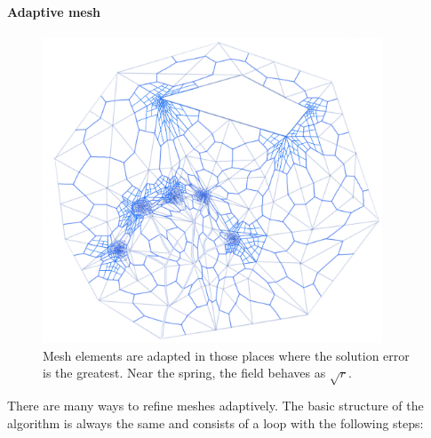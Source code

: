 \documentclass[]{pracamgr}
\begin{document}
      \paragraph{Adaptive mesh}

        \begin{figure}[H]
          \centering
          \includegraphics[width=0.9\textwidth]{figs/adaptive_refinment.jpg}        
          \caption{Mesh elements are adapted in those places where the solution error is the greatest. Near the spring, the field behaves as $\sqrt{r}$.}
          \label{adaptive_refinment}
        \end{figure}

        There are many ways to refine meshes adaptively. The basic structure of the algorithm is always the same and consists of a loop with the following steps:
\end{document}
